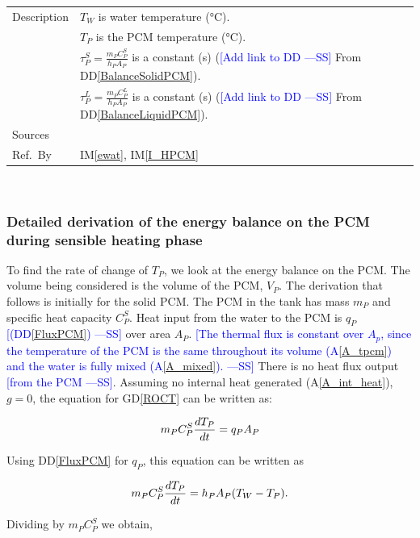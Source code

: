 \documentclass[12pt]{article}
\newcommand{\authornote}[3]{\textcolor{#1}{[#3 ---#2]}}
\newcommand{\authornote}[3]{}
\newcommand{\wss}[1]{\authornote{blue}{SS}{#1}}
\newcommand{\colAwidth}{0.13\textwidth}
\newcommand{\colBwidth}{0.82\textwidth}
\newcommand{\dref}[1]{GD\ref{#1}}
\newcommand{\ddref}[1]{DD\ref{#1}}
\newcommand{\aref}[1]{A\ref{#1}}
\newcommand{\iref}[1]{IM\ref{#1}}
\begin{document}
\begin{minipage}{\textwidth}
\begin{tabular}{| p{\colAwidth} | p{\colBwidth}|}
  \hline
  Description&$T_W$ is water temperature (\si{\celsius}).\\
  &$T_P$ is the PCM temperature (\si{\celsius}).\\
  &$\tau^S_P = \frac{m_P C^S_P}{h_P A_P}$ is a constant
  (\si{\second}) (\wss{Add link to DD} From \ddref{BalanceSolidPCM}).\\
  &$\tau^L_P = \frac{m_P C^L_P}{h_P A_P}$ is a constant
  (\si{\second}) (\wss{Add link to DD} From \ddref{BalanceLiquidPCM}).
  \\
  \hline
  Sources&~\cite{Lightstone2012}\ \\
  \hline
  Ref.\ By & \iref{ewat}, \iref{I_HPCM}\\
  \hline
\end{tabular}
\end{minipage}\\

\subsubsection*{Detailed derivation of the energy balance on the PCM during sensible heating phase}

To find the rate of change of $T_P$, we look at the energy balance on the PCM.
The volume being considered is the volume of the PCM, $V_P$.  The derivation
that follows is initially for the solid PCM.  The PCM in the tank has mass $m_P$
and specific heat capacity $C^S_P$.  Heat input from the water to the PCM is
$q_P$ \wss{(\ddref{FluxPCM})} over area $A_P$.  \wss{The thermal flux is constant
  over $A_p$, since the temperature of the PCM is the same throughout its
  volume (\aref{A_tpcm}) and the water is fully mixed (\aref{A_mixed}).}  There is
no heat flux output \wss{from the PCM}.  Assuming no internal heat generated
(\aref{A_int_heat}), $g=0$, the equation for \dref{ROCT} can be written as:

\begin{equation*}
\\m_P C_P^S \frac{d T_P}{dt} = q_P A_P
\end{equation*}

\noindent
Using \ddref{FluxPCM} for $q_P$, this equation can be written as

\begin{equation*}
\\m_P C^S_P \frac{dT_P}{dt} = h_P A_P (T_W - T_P).
\end{equation*}

\noindent
Dividing by $m_P C^S_P$ we obtain,
\end{document}

